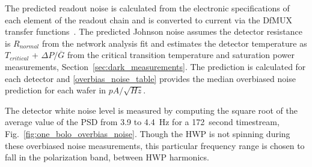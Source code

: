 \documentclass[../EBEXPaper2.tex]{subfiles}
\begin{document}
The predicted readout noise is calculated from the electronic specifications of each element of the readout chain and is converted to current via the \ac{DfMUX} transfer functions~\citep{aubin_thesis}. 
The predicted Johnson noise assumes the detector resistance is $R_{normal}$ from the network analysis fit and estimates the detector temperature as $T_{critical}$ + $\Delta P / \overline{G}$ from the critical transition temperature and saturation power measurements, Section~\ref{sec:dark_measurements}. 
The prediction is calculated for each detector and \TAB\ref{overbias_noise_table} provides the median overbiased noise prediction for each wafer in $pA/\sqrt{Hz}$. %

The detector white noise level is measured 
by computing the square root of the average value of the \ac{PSD} from 3.9 to 4.4~Hz for a 172~second 
timestream, Fig.~\ref{fig:one_bolo_overbias_noise}. 
Though the \ac{HWP} is not spinning during these overbiased noise measurements, this particular frequency range is chosen to fall in the polarization band, between \ac{HWP} harmonics. 
\end{document}
